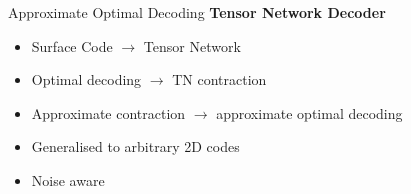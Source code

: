 \documentclass{dfki}
\begin{document}
\begin{frame}{Approximate Optimal Decoding}
	\textbf{Tensor Network Decoder~}
		\begin{itemize}
			\item Surface Code $\rightarrow$ Tensor Network
			\pause
			\item Optimal decoding $\rightarrow$ TN contraction
			\item Approximate contraction $\rightarrow$ approximate optimal decoding
			\pause
			\item Generalised to arbitrary 2D codes 
			\item Noise aware~
		\end{itemize}
\end{frame}
\end{document}
